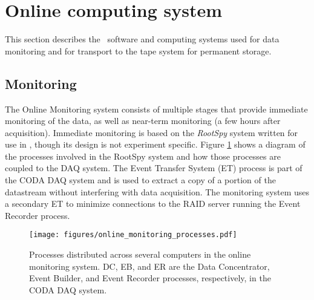 
\section[Online computing system]{Online computing system \label{sec:online}}

This section describes the \GX ~software and computing systems  used for data monitoring and for transport to the tape system for permanent storage.

\subsection{Monitoring \label{sec:onlinemonitoring}}

The Online Monitoring system consists of multiple stages that provide immediate monitoring of the data, as well as near-term monitoring (a few hours after acquisition). Immediate monitoring is based on the \textit{RootSpy} system\cite{rootspy} written for use in \GX, though its design is not experiment specific. Figure \ref{fig:online_monitoring_processes} shows a diagram of the processes involved in the RootSpy system and how those processes are coupled to the DAQ system. The Event Transfer System (ET) process is part of the CODA DAQ system \cite{coda} and is used to extract a copy of a portion of the datastream without interfering with data acquisition. The monitoring system uses a secondary ET to minimize connections to the RAID server running the Event Recorder process.

\begin{figure}[tbp]
\begin{center}
\texttt{[image: figures/online\_monitoring\_processes.pdf]}
\caption{\label{fig:online_monitoring_processes}Processes distributed across several computers in the online monitoring system. DC, EB, and ER are the Data Concentrator, Event Builder, and Event Recorder processes, respectively, in the CODA DAQ system.}   
\end{center}  
\end{figure}

